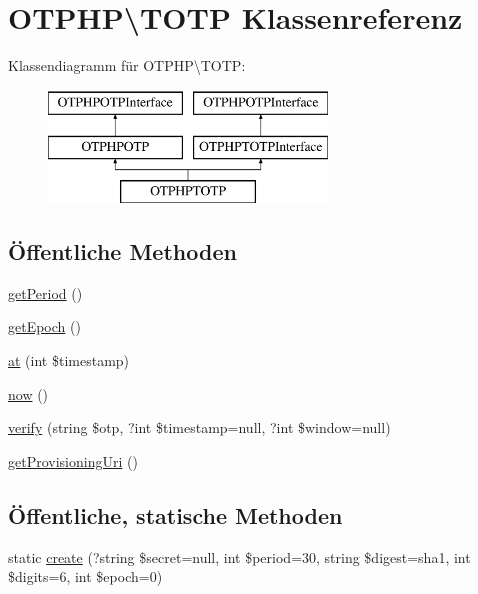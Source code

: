 \hypertarget{class_o_t_p_h_p_1_1_t_o_t_p}{}\section{O\+T\+P\+HP\textbackslash{}T\+O\+TP Klassenreferenz}
\label{class_o_t_p_h_p_1_1_t_o_t_p}
Klassendiagramm für O\+T\+P\+HP\textbackslash{}T\+O\+TP\+:\begin{figure}[H]
\begin{center}
\leavevmode
\includegraphics[height=3.000000cm]{class_o_t_p_h_p_1_1_t_o_t_p}
\end{center}
\end{figure}
\subsection*{Öffentliche Methoden}
\begin{DoxyCompactItemize}
\item 
\mbox{\hyperlink{class_o_t_p_h_p_1_1_t_o_t_p_a0c10be1997c54b7ab6fbbd7f72bbeb0b}{get\+Period}} ()
\item 
\mbox{\hyperlink{class_o_t_p_h_p_1_1_t_o_t_p_a5ec39dcc8f5605e3505d2ace2a6d726c}{get\+Epoch}} ()
\item 
\mbox{\hyperlink{class_o_t_p_h_p_1_1_t_o_t_p_a22513da78ec8fd1009910bc8f9a676f0}{at}} (int \$timestamp)
\item 
\mbox{\hyperlink{class_o_t_p_h_p_1_1_t_o_t_p_ab07cbc06fbc17b68852cdf722f40e58e}{now}} ()
\item 
\mbox{\hyperlink{class_o_t_p_h_p_1_1_t_o_t_p_a09c72fb5facb96625474d20540ad7bf0}{verify}} (string \$otp, ?int \$timestamp=null, ?int \$window=null)
\item 
\mbox{\hyperlink{class_o_t_p_h_p_1_1_t_o_t_p_a85b294664fda16d6b87d80e645714ed0}{get\+Provisioning\+Uri}} ()
\end{DoxyCompactItemize}
\subsection*{Öffentliche, statische Methoden}
\begin{DoxyCompactItemize}
\item 
static \mbox{\hyperlink{class_o_t_p_h_p_1_1_t_o_t_p_a1dafdd96e14b55175a139ac118e4182e}{create}} (?string \$secret=null, int \$period=30, string \$digest=\textquotesingle{}sha1\textquotesingle{}, int \$digits=6, int \$epoch=0)
\end{DoxyCompactItemize}
